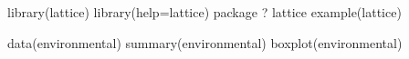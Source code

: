 \documentclass{article}
\begin{document}

library(lattice)
library(help=lattice)
package ? lattice
example(lattice)

data(environmental)
summary(environmental)
boxplot(environmental) 
\end{document}
